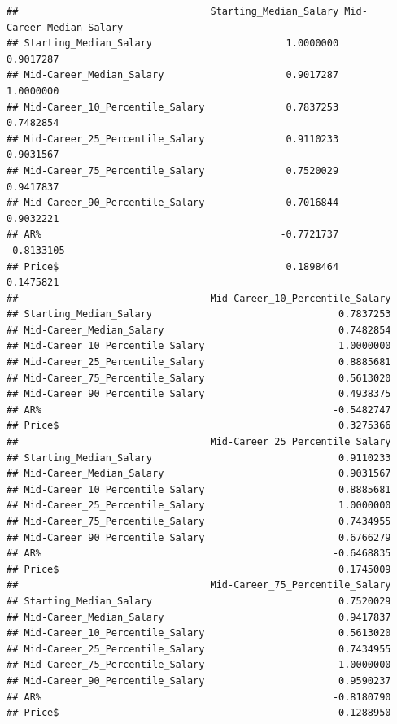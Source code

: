 \documentclass[]{article}
\begin{document}
\begin{verbatim}
##                                 Starting_Median_Salary Mid-Career_Median_Salary
## Starting_Median_Salary                       1.0000000                0.9017287
## Mid-Career_Median_Salary                     0.9017287                1.0000000
## Mid-Career_10_Percentile_Salary              0.7837253                0.7482854
## Mid-Career_25_Percentile_Salary              0.9110233                0.9031567
## Mid-Career_75_Percentile_Salary              0.7520029                0.9417837
## Mid-Career_90_Percentile_Salary              0.7016844                0.9032221
## AR%                                         -0.7721737               -0.8133105
## Price$                                       0.1898464                0.1475821
##                                 Mid-Career_10_Percentile_Salary
## Starting_Median_Salary                                0.7837253
## Mid-Career_Median_Salary                              0.7482854
## Mid-Career_10_Percentile_Salary                       1.0000000
## Mid-Career_25_Percentile_Salary                       0.8885681
## Mid-Career_75_Percentile_Salary                       0.5613020
## Mid-Career_90_Percentile_Salary                       0.4938375
## AR%                                                  -0.5482747
## Price$                                                0.3275366
##                                 Mid-Career_25_Percentile_Salary
## Starting_Median_Salary                                0.9110233
## Mid-Career_Median_Salary                              0.9031567
## Mid-Career_10_Percentile_Salary                       0.8885681
## Mid-Career_25_Percentile_Salary                       1.0000000
## Mid-Career_75_Percentile_Salary                       0.7434955
## Mid-Career_90_Percentile_Salary                       0.6766279
## AR%                                                  -0.6468835
## Price$                                                0.1745009
##                                 Mid-Career_75_Percentile_Salary
## Starting_Median_Salary                                0.7520029
## Mid-Career_Median_Salary                              0.9417837
## Mid-Career_10_Percentile_Salary                       0.5613020
## Mid-Career_25_Percentile_Salary                       0.7434955
## Mid-Career_75_Percentile_Salary                       1.0000000
## Mid-Career_90_Percentile_Salary                       0.9590237
## AR%                                                  -0.8180790
## Price$                                                0.1288950

\end{verbatim}
\end{document}
